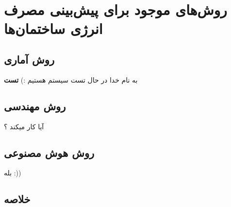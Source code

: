 \chapter{روش‌های موجود برای پیش‌بینی مصرف انرژی ساختمان‌ها}
\section{روش آماری}
به نام خدا در حال تست سیستم هستیم :)
\textbf{تست}
\section{روش مهندسی}
آیا کار میکند ؟
\section{روش هوش مصنوعی}
بله :))
\section{خلاصه}